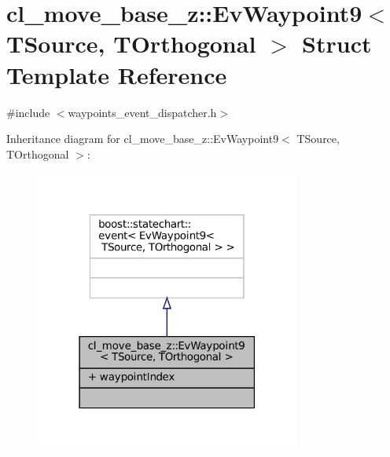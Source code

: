 \hypertarget{structcl__move__base__z_1_1EvWaypoint9}{}\section{cl\+\_\+move\+\_\+base\+\_\+z\+:\+:Ev\+Waypoint9$<$ T\+Source, T\+Orthogonal $>$ Struct Template Reference}
\label{structcl__move__base__z_1_1EvWaypoint9}


{\ttfamily \#include $<$waypoints\+\_\+event\+\_\+dispatcher.\+h$>$}



Inheritance diagram for cl\+\_\+move\+\_\+base\+\_\+z\+:\+:Ev\+Waypoint9$<$ T\+Source, T\+Orthogonal $>$\+:
\nopagebreak
\begin{figure}[H]
\begin{center}
\leavevmode
\includegraphics[width=247pt]{structcl__move__base__z_1_1EvWaypoint9__inherit__graph}
\end{center}
\end{figure}


